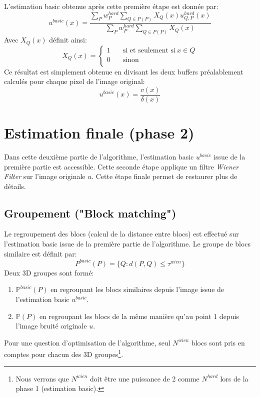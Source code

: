 \newline 
\newline
L'estimation basic obtenue après cette première étape est donnée par:
\begin{equation}
u^{basic}(x) = \frac{\displaystyle\sum_{P}w^{hard}_P \displaystyle\sum_{Q \in P(P)}X_Q(x)u^{hard}_{Q,P}(x)}{\displaystyle\sum_{P}w^{hard}_P \displaystyle\sum_{Q \in P(P)}X_Q(x)}
\end{equation}
\newpage
Avec \(X_Q(x)\) définit ainsi:
\[ X_Q(x) =
  \begin{cases}
    1       & \quad \text{si et seulement si} \: x  \in Q \\
    0       & \quad \text{sinon}\\
  \end{cases}
\]
Ce résultat est simplement obtenue en divisant les deux buffers préalablement calculés pour chaque pixel de l'image original: 
\begin{equation}
u^{basic}(x) = \frac{v(x)}{\delta(x)}
\end{equation}
\newpage

\section{Estimation finale (phase 2)}
Dans cette deuxième partie de l'algorithme, l'estimation basic \(u^{basic} \) issue de la première partie est accessible. Cette seconde étape applique un filtre \textit{Wiener Filter} sur l'image originale \(u \). Cette étape finale permet de restaurer plus de détails. 
\subsection{Groupement ("Block matching")}
Le regroupement des blocs (calcul de la distance entre blocs) est effectué sur l'estimation basic issue de la première partie de l'algorithme. Le groupe de blocs similaire est définit par:
\begin{equation}
P^{basic}(P) = \{ Q: d(P,Q) \leq \tau^{wien} \}
\end{equation}
Deux 3D groupes sont formé:
 \begin{enumerate}
\item \(\mathbb{P}^{basic}(P) \) en regroupant les blocs similaires  depuis l'image issue de l'estimation basic \(u^{basic}\).
\item \(\mathbb{P}(P)\) en regroupant les blocs de la même manière qu'au point 1 depuis l'image bruité originale \(u\).
\end{enumerate}
Pour une question d'optimisation de l'algorithme, seul \(N^{wien} \) blocs sont pris en comptes pour chacun des 3D groupes\footnote{Nous verrons que \(N^{wien} \) doit être une puissance de 2 comme \(N^{hard} \) lors de la phase 1 (estimation basic).}.
